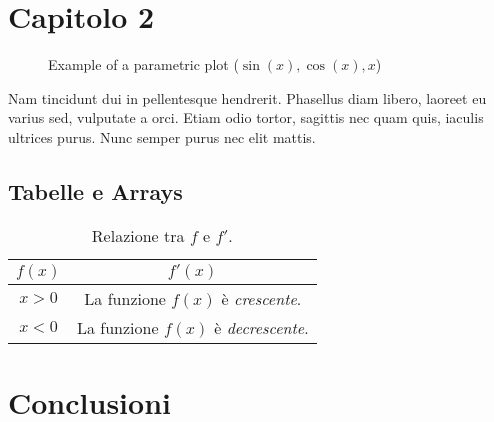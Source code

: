 \documentclass[11pt, landscape]{article}
\begin{document}


\section{Capitolo 2}
\begin{figure}[h!]

\caption{Example of a parametric plot ($\sin (x), \cos(x), x$)}
\end{figure}
\noindent
Nam tincidunt dui in pellentesque hendrerit. Phasellus diam libero, laoreet eu varius sed, vulputate a orci. Etiam odio tortor, sagittis nec quam quis, iaculis ultrices purus. Nunc semper purus nec elit mattis.\\



	\subsection{Tabelle e Arrays}
	\begin{table}[H]
	\centering
	\caption{Relazione tra $f$ e $f'$.}
	\def\arraystretch{1.5}
	\begin{tabular}{|c|c|} %
	\hline
	$f(x)$ & $f'(x)$\\ \hline
	$x>0$ & La funzione $f(x)$ è \emph{crescente}. \\
	\hline
	$x<0$ & La funzione $f(x)$ è \emph{decrescente}. \\
	\hline		
	\end{tabular}
		
	\end{table}
\section{Conclusioni}
\end{document}
